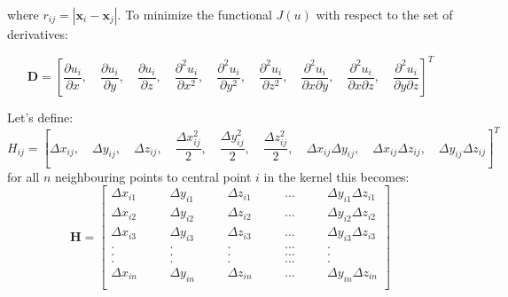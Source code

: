 \documentclass[12pt]{extarticle}
\begin{document}
where $r_{ij} = |\textbf{x}_{i}-\textbf{x}_{j}|$. To minimize the functional $J(u)$ with respect to the set of derivatives:

\begin{equation}
    \textbf{D} = \left[ \frac{\partial u_{i}}{\partial x}, \quad  \frac{\partial u_{i}}{\partial y}, \quad  \frac{\partial u_{i}}{\partial z},  \quad \frac{\partial^{2} u_{i}}{\partial x^{2}},  \quad  \frac{\partial^{2} u_{i}}{\partial y^{2}}, \quad  \frac{\partial^{2} u_{i}}{\partial z^{2}}, \quad  \frac{\partial^{2} u_{i}}{\partial x \partial y}, \quad  \frac{\partial^{2} u_{i}}{\partial x \partial z}, \quad \frac{\partial^{2} u_{i}}{\partial y \partial z} \right]^{T}
\end{equation}

Let's define:
\begin{equation}
    H_{ij} = \left[ \Delta x_{ij}, \quad \Delta y_{ij}, \quad \Delta z_{ij}, \quad \frac{\Delta x_{ij}^{2}}{2}, \quad \frac{\Delta y^{2}_{ij}}{2}, \quad \frac{\Delta z^{2}_{ij}}{2}, \quad \Delta x_{ij} \Delta y_{ij}, \quad  \Delta x_{ij} \Delta z_{ij},  \quad \Delta y_{ij} \Delta z_{ij} \right]^{T}
\end{equation}
for all $n$ neighbouring points to central point $i$ in the kernel this becomes:
\begin{equation*}
\textbf{H}= 
  \begin{bmatrix}
      \Delta x_{i1} & \quad  & \Delta y_{i1} & \quad  & \Delta z_{i1} & \quad & ... & \quad & \Delta y_{i1} \Delta z_{i1} \\
      \Delta x_{i2} & \quad  & \Delta y_{i2} & \quad  & \Delta z_{i2} & \quad & ... & \quad & \Delta y_{i2} \Delta z_{i2} \\
      \Delta x_{i3} & \quad  & \Delta y_{i3} & \quad  & \Delta z_{i3} & \quad & ... & \quad & \Delta y_{i3} \Delta z_{i3} \\
    . & \quad  & . & \quad  & . & \quad & ... & \quad & . \\
    . & \quad  & . & \quad  & . & \quad & ... & \quad & . \\
    . & \quad  & . & \quad  & . & \quad & ... & \quad & . \\
      \Delta x_{in} & \quad  & \Delta y_{in} & \quad  & \Delta z_{in} & \quad & ... & \quad & \Delta y_{in} \Delta z_{in} \\
  \end{bmatrix}
\end{equation*}
\end{document}
